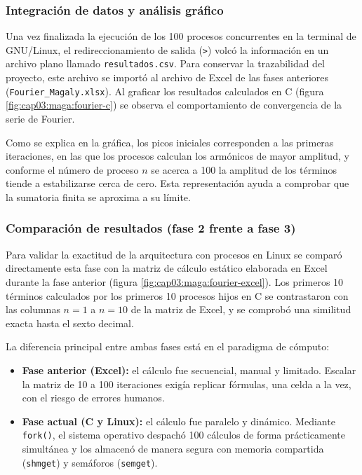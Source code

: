 \subsubsection{Integración de datos y análisis gráfico}
\label{sec:cap03:maga:resultados}

Una vez finalizada la ejecución de los 100 procesos concurrentes en la terminal de GNU/Linux, el redireccionamiento de salida (\texttt{>}) volcó la información en un archivo plano llamado \texttt{resultados.csv}. Para conservar la trazabilidad del proyecto, este archivo se importó al archivo de Excel de las fases anteriores (\texttt{Fourier\_Magaly.xlsx}). Al graficar los resultados calculados en C (figura \ref{fig:cap03:maga:fourier-c}) se observa el comportamiento de convergencia de la serie de Fourier.


Como se explica en la gráfica, los picos iniciales corresponden a las primeras iteraciones, en las que los procesos calculan los armónicos de mayor amplitud, y conforme el número de proceso $n$ se acerca a 100 la amplitud de los términos tiende a estabilizarse cerca de cero. Esta representación ayuda a comprobar que la sumatoria finita se aproxima a su límite.

\subsubsection{Comparación de resultados (fase 2 frente a fase 3)}
\label{sec:cap03:maga:comparacion}

Para validar la exactitud de la arquitectura con procesos en Linux se comparó directamente esta fase con la matriz de cálculo estático elaborada en Excel durante la fase anterior (figura \ref{fig:cap03:maga:fourier-excel}). Los primeros 10 términos calculados por los primeros 10 procesos hijos en C se contrastaron con las columnas $n = 1$ a $n = 10$ de la matriz de Excel, y se comprobó una similitud exacta hasta el sexto decimal.

La diferencia principal entre ambas fases está en el paradigma de cómputo:

\begin{itemize}
    \item \textbf{Fase anterior (Excel):} el cálculo fue secuencial, manual y limitado. Escalar la matriz de 10 a 100 iteraciones exigía replicar fórmulas, una celda a la vez, con el riesgo de errores humanos.
    \item \textbf{Fase actual (C y Linux):} el cálculo fue paralelo y dinámico. Mediante \texttt{fork()}, el sistema operativo despachó 100 cálculos de forma prácticamente simultánea y los almacenó de manera segura con memoria compartida (\texttt{shmget}) y semáforos (\texttt{semget}).
\end{itemize}

